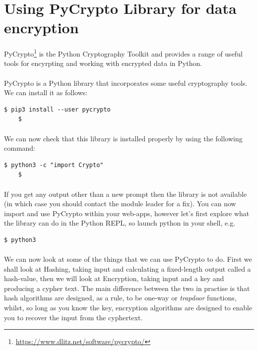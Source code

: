 \documentclass[12pt, a4paper, oneside]{book}
\begin{document}
{\section{Using PyCrypto Library for data encryption}
\label{pycrypto}
\paragraph{} PyCrypto\footnote{\url{https://www.dlitz.net/software/pycrypto/}} is the Python Cryptography Toolkit and provides a range of useful tools for encyrpting and working with encrypted data in Python. 

\paragraph{} PyCrypto is a Python library that incorporates some useful cryptography tools. We can install it as follows:
\begin{lstlisting}[style=DOS]
    $ pip3 install --user pycrypto
    $
\end{lstlisting}

\paragraph{} We can now check that this library is installed properly by using the following command:
\begin{lstlisting}[style=DOS]
    $ python3 -c "import Crypto"
    $
\end{lstlisting}

\paragraph{} If you get any output other than a new prompt then the library is not available (in which case you should contact the module leader for a fix). You can now import and use PyCrypto within your web-apps, however let's first explore what the library can do in the Python REPL, so launch python in your shell, e.g.

\begin{lstlisting}[style=DOS]
    $ python3
\end{lstlisting}

\paragraph{} We can now look at some of the things that we can use PyCrypto to do. First we shall look at Hashing, taking input and calculating a fixed-length output called a hash-value, then we will look at Encryption, taking input and a key and producing a cypher text. The main difference between the two in practise is that hash algorithms are designed, as a rule, to be one-way or \emph{trapdoor} functions, whilst, so long as you know the key, encryption algorithms are designed to enable you to recover the input from the cyphertext.

}
\end{document}
